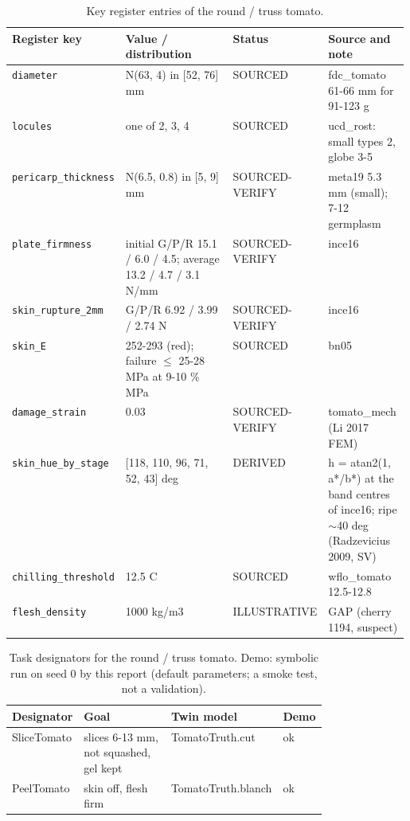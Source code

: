 \documentclass[10.5pt,a4paper]{article}
\begin{document}
\begin{table}[htbp]\centering\scriptsize\caption{Key register entries of the round / truss tomato.}
\begin{tabularx}{\linewidth}{@{}p{0.19\linewidth}p{0.27\linewidth}p{0.12\linewidth}X@{}}\toprule Register key & Value / distribution & Status & Source and note \\\midrule
\texttt{diameter} & N(63, 4) in [52, 76] mm & SOURCED & fdc\_tomato 61-66 mm for 91-123 g \\
\texttt{locules} & one of 2, 3, 4 & SOURCED & ucd\_rost: small types 2, globe 3-5 \\
\texttt{pericarp\_\allowbreak{}thickness} & N(6.5, 0.8) in [5, 9] mm & SOURCED-VERIFY & meta19 5.3 mm (small); 7-12 germplasm \\
\texttt{plate\_\allowbreak{}firmness} & initial G/P/R 15.1 / 6.0 / 4.5; average 13.2 / 4.7 / 3.1 N/mm & SOURCED-VERIFY & ince16 \\
\texttt{skin\_\allowbreak{}rupture\_\allowbreak{}2mm} & G/P/R 6.92 / 3.99 / 2.74 N & SOURCED-VERIFY & ince16 \\
\texttt{skin\_\allowbreak{}E} & 252-293 (red); failure $\le$ 25-28 MPa at 9-10 \% MPa & SOURCED & bn05 \\
\texttt{damage\_\allowbreak{}strain} & 0.03 & SOURCED-VERIFY & tomato\_mech (Li 2017 FEM) \\
\texttt{skin\_\allowbreak{}hue\_\allowbreak{}by\_\allowbreak{}stage} & [118, 110, 96, 71, 52, 43] deg & DERIVED & h = atan2(1, a*/b*) at the band centres of ince16; ripe $\sim$40 deg (Radzevicius 2009, SV) \\
\texttt{chilling\_\allowbreak{}threshold} & 12.5 C & SOURCED & wflo\_tomato 12.5-12.8 \\
\texttt{flesh\_\allowbreak{}density} & 1000 kg/m3 & ILLUSTRATIVE & GAP (cherry 1194, suspect) \\\bottomrule\end{tabularx}\end{table}
\begin{table}[htbp]\centering\scriptsize\caption{Task designators for the round / truss tomato. Demo: symbolic run on seed 0 by this report (default parameters; a smoke test, not a validation).}
\begin{tabularx}{\linewidth}{@{}p{0.16\linewidth}Xp{0.3\linewidth}l@{}}\toprule Designator & Goal & Twin model & Demo \\\midrule
SliceTomato & slices 6-13 mm, not squashed, gel kept & TomatoTruth.cut & ok \\
PeelTomato & skin off, flesh firm & TomatoTruth.blanch & ok \\\bottomrule\end{tabularx}\end{table}
\end{document}
